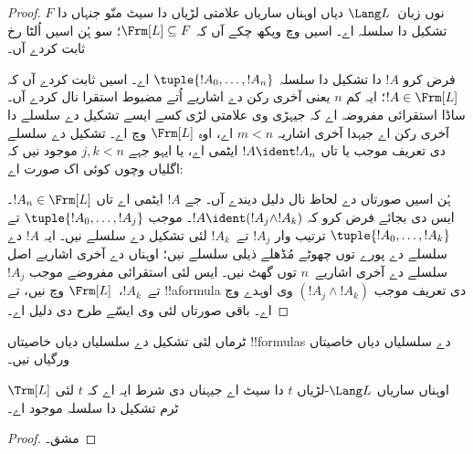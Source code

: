 \documentclass[../../../include/open-logic-section]{subfiles}
\begin{document}
\begin{proof}
$F$ نوں زبان~$\Lang L$ دیاں اوہناں ساریاں علامتی
لڑیاں دا سیٹ منّو جنہاں دا تشکیل دا سلسلہ اے۔
اسیں  وچ
ویکھ چکے آں کہ $\Frm[L] \subseteq F$؛ سو ہُن
اسیں اُلٹا رخ ثابت کردے آں۔

فرض کرو $!A$ دا تشکیل دا سلسلہ
$\tuple{!A_0,\dotsc,!A_n}$ اے۔ اسیں ثابت
کردے آں کہ $!A \in \Frm[L]$؛ ایہ کم
$n$ یعنی آخری رکن دے اشاریے اُتے مضبوط استقرا نال کردے آں۔
ساڈا استقرائی مفروضہ اے کہ جیہڑی وی علامتی لڑی
کسے ایسے تشکیل دے سلسلے دا آخری رکن اے
جیہدا آخری اشاریہ $m < n$ اے، اوہ $\Frm[L]$ وچ اے۔
تشکیل دے سلسلے دی تعریف موجب یا تاں
$!A \ident !A_n$ ایٹمی اے، یا ایہو جہے
$j,k < n$ موجود نیں کہ اگلیاں وچوں کوئی اک صورت اے:
\begin{enumerate}
\end{enumerate}
ہُن اسیں صورتاں دے لحاظ نال دلیل دیندے آں۔
جے $!A$ ایٹمی اے تاں $!A_n \in \Frm[L]$۔
ایس دی بجائے فرض کرو کہ $!A \ident (!A_j \land !A_k)$۔
 موجب
$\tuple{!A_0,\dotsc,!A_j}$ تے
$\tuple{!A_0,\dotsc,!A_k}$ ترتیب وار
$!A_j$ تے~$!A_k$ لئی تشکیل دے سلسلے نیں۔
ایہ $!A$ دے سلسلے دے پورے توں چھوٹے مُڈھلے
ذیلی سلسلے نیں؛ اوہناں دے آخری اشاریے
اصل سلسلے دے آخری اشاریے~$n$ توں گھٹ نیں۔
ایس لئی استقرائی مفروضے
موجب $!A_j$ تے~$!A_k$،~$\Frm[L]$ وچ نیں،
تے !!a{formula} دی تعریف موجب
$(!A_j \land !A_k)$ وی اوہدے وچ اے۔
باقی صورتاں لئی وی ایسّے طرح دی دلیل اے۔
\end{proof}

ٹرماں لئی تشکیل دے سلسلیاں دیاں خاصیتاں
!!{formula}s دے سلسلیاں دیاں خاصیتاں ورگیاں نیں۔

\begin{prop}
$\Trm[L]$ اوہناں ساریاں $\Lang L$-لڑیاں $t$
دا سیٹ اے جیہناں دی شرط ایہ اے کہ $t$ لئی ٹرم تشکیل دا سلسلہ موجود اے۔
\end{prop}

\begin{proof}
مشق۔
\end{proof}
\end{document}
